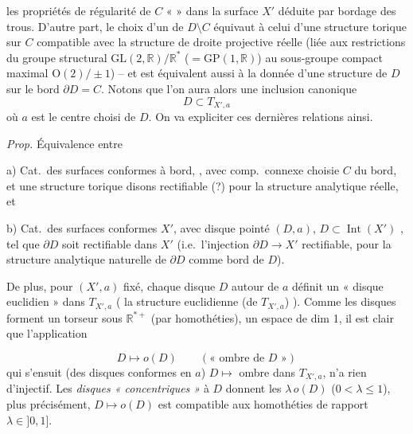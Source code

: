 \documentclass[11pt,a4paper]{article}
\begin{document}

les propriétés de régularité de $C$  
«  » dans la surface 
\struck{\ill{}} $X'$ déduite par bordage des trous. D'autre part, le choix
d'un  de $D \setminus C$ équivaut à celui d'une structure
torique sur $C$ compatible avec la structure de droite projective réelle
(liée aux restrictions du groupe structural
$\mathrm{GL}(2,\mathbb{R})/\mathbb{R}^{*}$ ($= \mathrm{GP}(1,\mathbb{R})$)
au sous-groupe compact maximal $\mathrm{O}(2)/\pm 1$) -- et est équivalent
aussi à la donnée d'une structure  de $D$ sur le bord
$\partial D = C$. Notons que l'on aura alors une inclusion canonique
\[
  D \subset T_{X',a}
\]
où $a$ est le centre choisi de $D$. On va expliciter  ces
dernières relations ainsi.

\emph{Prop.} Équivalence entre 


a) Cat.\ des surfaces conformes à bord, , avec comp.\
connexe choisie $C$ du bord, et une structure torique disons rectifiable
(?) pour la structure analytique réelle, et

b) Cat.\ des surfaces conformes  $X'$, avec \struck{\ill{}}
disque pointé $(D, a)$, $D \subset \operatorname{Int}(X')$ \ill{}, tel que
$\partial D$ soit rectifiable dans $X'$ (i.e.\ l'injection
$\partial D \to X'$ rectifiable, pour la structure analytique naturelle de
$\partial D$ comme bord de $D$).

De plus, pour $(X', a)$ fixé, chaque disque $D$ autour de $a$ définit un
« disque \struck{canonique} euclidien » dans $T_{X',a}$ (\ill{} la structure
euclidienne (de $T_{X',a}$) \uncertain{conforme}). Comme les disques forment
un torseur sous $\mathbb{R}^{*+}$ (par homothéties), \uncertain{i.e.} un
espace de dim 1, il est clair que l'application


\[
  D \longmapsto o(D) \qquad (\text{« ombre de } D \text{ »})
\]
qui s'ensuit (des disques conformes  en $a$)
$D \mapsto$ ombre  dans $T_{X',a}$, n'a rien d'injectif. Les
\emph{disques « concentriques »} à $D$ donnent les $\lambda\, o(D)$
($0 < \lambda \leq 1$), plus précisément, $D \mapsto o(D)$ est compatible
aux homothéties de rapport \struck{$\lambda \leq$} $\lambda \in {]0,1]}$.
\end{document}
